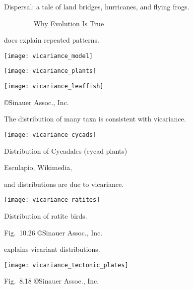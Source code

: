 \documentclass[t]{beamer}
\begin{document}
%
{

\begin{frame}[b]{Dispersal: a tale of land bridges, hurricanes, and flying frogs.}

\hfill \tiny \textcolor{white}{Courtesy \href{https://whyevolutionistrue.wordpress.com/2013/09/13/nasa-launches-a-frog-and-experimental-biogeograhy/}{Why Evolution Is True}}

\end{frame}
}
%
\begin{frame}[t]{ does explain repeated patterns.}

\texttt{[image: vicariance\_model]}
\begin{multicols}{2}
	\texttt{[image: vicariance\_plants]}

	\columnbreak
	
	\texttt{[image: vicariance\_leaffish]}
	
\end{multicols}

	\vfilll
	
	\hfill \tiny \copyright Sinauer Assoc., Inc.
\end{frame}
%
\begin{frame}[t]{The distribution of many taxa is consistent with vicariance.}

	\texttt{[image: vicariance\_cycads]}
	
	{\centering
	Distribution of Cycadales (cycad plants)\par
	}
	
	\vfilll
	
	\hfill \tiny Esculapio, Wikimedia, 
\end{frame}
%
\begin{frame}[t]{ and  distributions are due to vicariance.}

	\texttt{[image: vicariance\_ratites]}
	
	{\centering
	Distribution of ratite birds.\par	
	}
	\vfilll
	
	\hfill \tiny Fig.~10.26 \copyright Sinauer Assoc., Inc.
\end{frame}
%
\begin{frame}[t]{ explains vicariant distributions.}

	\vspace*{-0.5\baselineskip}
	
	\texttt{[image: vicariance\_tectonic\_plates]}
	
	\vfilll
	
	\hfill \tiny Fig.~8.18 \copyright Sinauer Assoc., Inc.
\end{frame}
\end{document}
